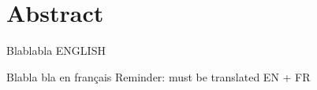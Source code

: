 \chapter*{Abstract}

Blablabla ENGLISH

Blabla bla en français Reminder: must be translated EN + FR


\newpage
